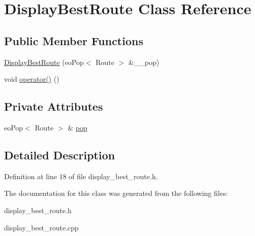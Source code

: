 \hypertarget{classDisplayBestRoute}{
\section{Display\-Best\-Route Class Reference}
\label{classDisplayBestRoute}
}
\subsection*{Public Member Functions}
\begin{CompactItemize}
\item 
\hypertarget{classDisplayBestRoute_db263e38f1e82174f811bf62f323f87f}{
\hyperlink{classDisplayBestRoute_db263e38f1e82174f811bf62f323f87f}{Display\-Best\-Route} (eo\-Pop$<$ Route $>$ \&\_\-\_\-pop)}
\label{classDisplayBestRoute_db263e38f1e82174f811bf62f323f87f}

\item 
\hypertarget{classDisplayBestRoute_ee879344a6d8b81a04d4eabbed2c7a04}{
void \hyperlink{classDisplayBestRoute_ee879344a6d8b81a04d4eabbed2c7a04}{operator()} ()}
\label{classDisplayBestRoute_ee879344a6d8b81a04d4eabbed2c7a04}

\end{CompactItemize}
\subsection*{Private Attributes}
\begin{CompactItemize}
\item 
\hypertarget{classDisplayBestRoute_5270aabbf294d2deca9878934216eb89}{
eo\-Pop$<$ Route $>$ \& \hyperlink{classDisplayBestRoute_5270aabbf294d2deca9878934216eb89}{pop}}
\label{classDisplayBestRoute_5270aabbf294d2deca9878934216eb89}

\end{CompactItemize}


\subsection{Detailed Description}




Definition at line 18 of file display\_\-best\_\-route.h.

The documentation for this class was generated from the following files:\begin{CompactItemize}
\item 
display\_\-best\_\-route.h\item 
display\_\-best\_\-route.cpp\end{CompactItemize}
